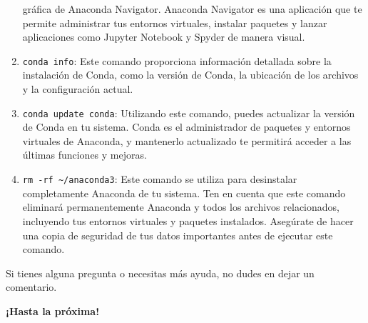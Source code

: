 \documentclass[
  letterpaper,
  DIV=11,
  numbers=noendperiod]{scrartcl}
\begin{document}
\begin{enumerate}
  gráfica de Anaconda Navigator. Anaconda Navigator es una aplicación
  que te permite administrar tus entornos virtuales, instalar paquetes y
  lanzar aplicaciones como Jupyter Notebook y Spyder de manera visual.
\item
  \texttt{conda\ info}: Este comando proporciona información detallada
  sobre la instalación de Conda, como la versión de Conda, la ubicación
  de los archivos y la configuración actual.
\item
  \texttt{conda\ update\ conda}: Utilizando este comando, puedes
  actualizar la versión de Conda en tu sistema. Conda es el
  administrador de paquetes y entornos virtuales de Anaconda, y
  mantenerlo actualizado te permitirá acceder a las últimas funciones y
  mejoras.
\item
  \texttt{rm\ -rf\ \textasciitilde{}/anaconda3}: Este comando se utiliza
  para desinstalar completamente Anaconda de tu sistema. Ten en cuenta
  que este comando eliminará permanentemente Anaconda y todos los
  archivos relacionados, incluyendo tus entornos virtuales y paquetes
  instalados. Asegúrate de hacer una copia de seguridad de tus datos
  importantes antes de ejecutar este comando.
\end{enumerate}

Si tienes alguna pregunta o necesitas más ayuda, no dudes en dejar un
comentario.

\textbf{¡Hasta la próxima!}


\printbibliography
\end{document}
